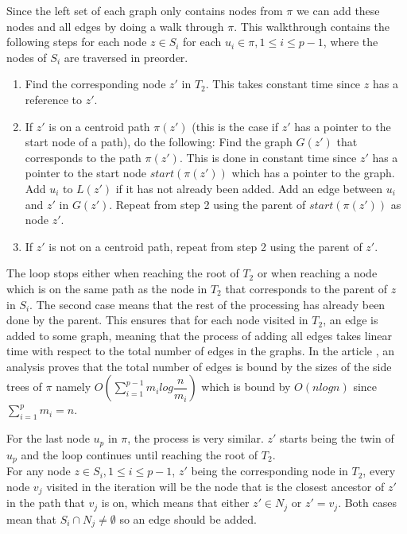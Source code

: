 Since the left set of each graph only contains nodes from $\pi$ we can add these nodes and all edges by doing a walk through $\pi$. This walkthrough contains the following steps for each node $z \in S_i$ for each $u_i \in \pi, 1 \le i \le p-1$, where the nodes of $S_i$ are traversed in preorder.

\begin{enumerate}
	\item Find the corresponding node $z'$ in $T_2$.
	\subitem This takes constant time since $z$ has a reference to $z'$.
	\item If $z'$ is on a centroid path $\pi(z')$ (this is the case if $z'$ has a pointer to the start node of a path), do the following:
	\subitem Find the graph $G(z')$ that corresponds to the path $\pi(z')$. This is done in constant time since $z'$ has a pointer to the start node $start(\pi(z'))$ which has a pointer to the graph.
	\subitem Add $u_i$ to $L(z')$ if it has not already been added.
	\subitem Add an edge between $u_i$ and $z'$ in $G(z')$.
	\subitem Repeat from step 2 using the parent of $start(\pi(z'))$ as node $z'$.
	\item If $z'$ is not on a centroid path, repeat from step 2 using the parent of $z'$.
\end{enumerate}
The loop stops either when reaching the root of $T_2$ or when reaching a node which is on the same path as the node in $T_2$ that corresponds to the parent of $z$ in $S_i$. The second case means that the rest of the processing has already been done by the parent. This ensures that for each node visited in $T_2$, an edge is added to some graph, meaning that the process of adding all edges takes linear time with respect to the total number of edges in the graphs. In the article \cite{nlogn}, an analysis proves that the total number of edges is bound by the sizes of the side trees of $\pi$ namely $O(\sum_{i=1}^{p-1}m_ilog\dfrac{n}{m_i})$ which is bound by $O(nlogn)$ since $\sum_{i=1}^{p} m_i = n$.

For the last node $u_p$ in $\pi$, the process is very similar. $z'$ starts being the twin of $u_p$ and the loop continues until reaching the root of $T_2$.\\

For any node $z \in S_i, 1 \le i \le p-1$, $z'$ being the corresponding node in $T_2$, every node $v_j$ visited in the iteration will be the node that is the closest ancestor of $z'$ in the path that $v_j$ is on, which means that either $z' \in N_j$ or $z'=v_j$. Both cases mean that $S_i \cap N_j \ne \emptyset$ so an edge should be added.

